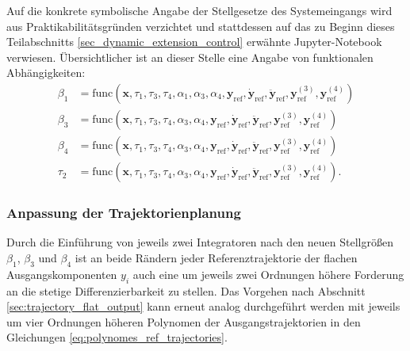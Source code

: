 Auf die konkrete symbolische Angabe der Stellgesetze des Systemeingangs wird aus Praktikabilitätsgründen verzichtet und stattdessen auf das zu Beginn dieses Teilabschnitts \ref{sec_dynamic_extension_control} erwähnte Jupyter-Notebook verwiesen. Übersichtlicher ist an dieser Stelle eine Angabe von funktionalen Abhängigkeiten:
\begin{subequations}
	\begin{align}
		\beta_1 &= \mathrm{func}(\mathbf{x}, \tau_1, \tau_3, \tau_4, \alpha_1, \alpha_3, \alpha_4, \mathbf{y}_{\mathrm{ref}}, \dot{\mathbf{y}}_{\mathrm{ref}}, \ddot{\mathbf{y}}_{\mathrm{ref}}, \mathbf{y}_{\mathrm{ref}}^{(3)}, \mathbf{y}_{\mathrm{ref}}^{(4)}) \\
		\beta_3 &= \mathrm{func}(\mathbf{x}, \tau_1, \tau_3, \tau_4, \alpha_3, \alpha_4, \mathbf{y}_{\mathrm{ref}}, \dot{\mathbf{y}}_{\mathrm{ref}}, \ddot{\mathbf{y}}_{\mathrm{ref}}, \mathbf{y}_{\mathrm{ref}}^{(3)}, \mathbf{y}_{\mathrm{ref}}^{(4)}) \\
		\beta_4 &= \mathrm{func}(\mathbf{x}, \tau_1, \tau_3, \tau_4, \alpha_3, \alpha_4, \mathbf{y}_{\mathrm{ref}}, \dot{\mathbf{y}}_{\mathrm{ref}}, \ddot{\mathbf{y}}_{\mathrm{ref}}, \mathbf{y}_{\mathrm{ref}}^{(3)}, \mathbf{y}_{\mathrm{ref}}^{(4)}) \\
		\tau_2 &= \mathrm{func}(\mathbf{x}, \tau_1, \tau_3, \tau_4, \alpha_3, \alpha_4, \mathbf{y}_{\mathrm{ref}}, \dot{\mathbf{y}}_{\mathrm{ref}}, \ddot{\mathbf{y}}_{\mathrm{ref}}, \mathbf{y}_{\mathrm{ref}}^{(3)}, \mathbf{y}_{\mathrm{ref}}^{(4)}).
	\end{align}
\end{subequations}

\subsubsection{Anpassung der Trajektorienplanung}
Durch die Einführung von jeweils zwei Integratoren nach den neuen Stellgrößen $\beta_1$, $\beta_3$ und $\beta_4$ ist an beide Rändern jeder Referenztrajektorie der flachen Ausgangskomponenten $y_i$ auch eine um  jeweils zwei Ordnungen höhere Forderung an die stetige Differenzierbarkeit zu stellen. Das Vorgehen nach Abschnitt \ref{sec:trajectory_flat_output} kann erneut analog durchgeführt werden mit jeweils um vier Ordnungen höheren Polynomen der Ausgangstrajektorien in den Gleichungen \eqref{eq:polynomes_ref_trajectories}.

